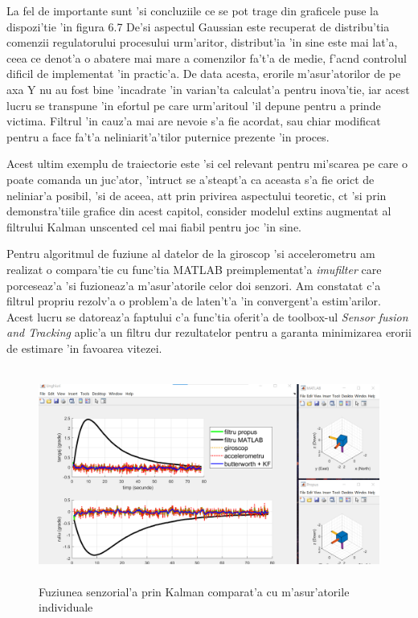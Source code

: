 \documentclass[12pt,a4paper,twoside]{report}
\begin{document}
La fel de importante sunt 'si concluziile ce se pot trage din graficele puse la dispozi'tie 'in figura 6.7 De'si aspectul Gaussian este recuperat de distribu'tia comenzii regulatorului procesului urm'aritor, distribut'ia 'in sine este mai lat'a, ceea ce denot'a o abatere mai mare a comenzilor fa't'a de medie, f'ac\ia nd controlul dificil de implementat 'in practic'a. De data acesta, erorile m'asur'atorilor de pe axa Y nu au fost bine 'incadrate 'in varian'ta calculat'a pentru inova'tie, iar acest lucru se transpune 'in efortul pe care urm'aritoul 'il depune pentru a prinde victima. Filtrul 'in cauz'a mai are nevoie s'a fie acordat, sau chiar modificat pentru a face fa't'a neliniarit'a'tilor puternice prezente 'in proces. 

\vspace{5px}

Acest ultim exemplu de traiectorie este 'si cel relevant pentru mi'scarea pe care o poate comanda un juc'ator, 'intruc\ia t se a'steapt'a ca aceasta s'a fie oric\ia t de neliniar'a posibil, 'si de aceea, at\ia t prin privirea aspectului teoretic, c\ia t 'si prin demonstra'tiile grafice din acest capitol, consider modelul extins augmentat al filtrului Kalman unscented cel mai fiabil pentru joc 'in sine.  

Pentru algoritmul de fuziune al datelor de la giroscop 'si accelerometru am realizat o compara'tie cu func'tia MATLAB preimplementat'a \textit{imufilter} \cite{imufilter} care porceseaz'a 'si fuzioneaz'a m'asur'atorile celor doi senzori. Am constatat c'a filtrul propriu rezolv'a o problem'a de laten't'a 'in convergent'a estim'arilor. Acest lucru se datoreaz'a faptului c'a func'tia oferit'a de toolbox-ul \textit{Sensor fusion and Tracking} aplic'a un filtru dur rezultatelor pentru a garanta minimizarea erorii de estimare 'in favoarea vitezei.


\begin{figure}[h]
\centering
 \includegraphics[width=150mm,height=70mm,]{img/compzero}
 \caption{Fuziunea senzorial'a prin Kalman comparat'a cu m'asur'atorile individuale}
\end{figure}
\end{document}

